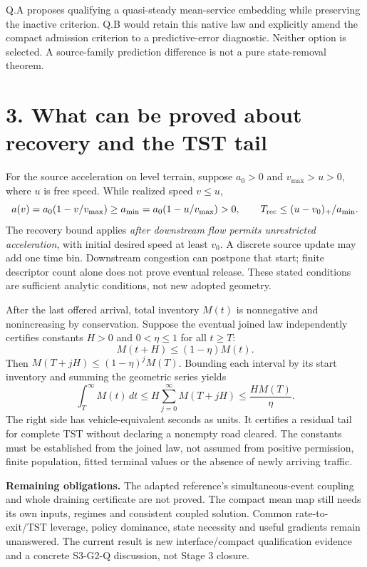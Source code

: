 \documentclass[11pt,a4paper]{article}
\begin{document}
Q.A proposes qualifying a quasi-steady mean-service embedding while preserving
the inactive criterion. Q.B would retain this native law and explicitly amend
the compact admission criterion to a predictive-error diagnostic. Neither
option is selected. A source-family prediction difference is not a pure
state-removal theorem.

\newpage
\section*{3. What can be proved about recovery and the TST tail}
For the source acceleration on level terrain, suppose $a_0>0$ and
$v_{\max}>u>0$, where $u$ is free speed. While realized speed $v\le u$,
\begin{equation}
a(v)=a_0(1-v/v_{\max})\ge a_{\min}
=a_0(1-u/v_{\max})>0,\qquad
T_{\rm rec}\le (u-v_0)_+/a_{\min}.
\end{equation}
The recovery bound applies \emph{after downstream flow permits unrestricted
acceleration}, with initial desired speed at least $v_0$. A discrete source
update may add one time bin. Downstream congestion can postpone that start;
finite descriptor count alone does not prove eventual release. These stated
conditions are sufficient analytic conditions, not new adopted geometry.

After the last offered arrival, total inventory $M(t)$ is nonnegative and
nonincreasing by conservation. Suppose the eventual joined law independently
certifies constants $H>0$ and $0<\eta\le1$ for all $t\ge T$:
\begin{equation}
M(t+H)\le(1-\eta)M(t).
\end{equation}
Then $M(T+jH)\le(1-\eta)^j M(T)$. Bounding each interval by its start inventory
and summing the geometric series yields
\begin{equation}
\int_T^\infty M(t)\,dt
\le H\sum_{j=0}^{\infty}M(T+jH)
\le \frac{H M(T)}{\eta}.
\end{equation}
The right side has vehicle-equivalent seconds as units. It certifies a residual
tail for complete TST without declaring a nonempty road cleared. The constants
must be established from the joined law, not assumed from positive permission,
finite population, fitted terminal values or the absence of newly arriving traffic.

\textbf{Remaining obligations.} The adapted reference's simultaneous-event
coupling and whole draining certificate are not proved. The compact mean map
still needs its own inputs, regimes and consistent coupled solution. Common
rate-to-exit/TST leverage, policy dominance, state necessity and useful gradients
remain unanswered. The current result is new interface/compact qualification
evidence and a concrete S3-G2-Q discussion, not Stage 3 closure.
\end{document}
